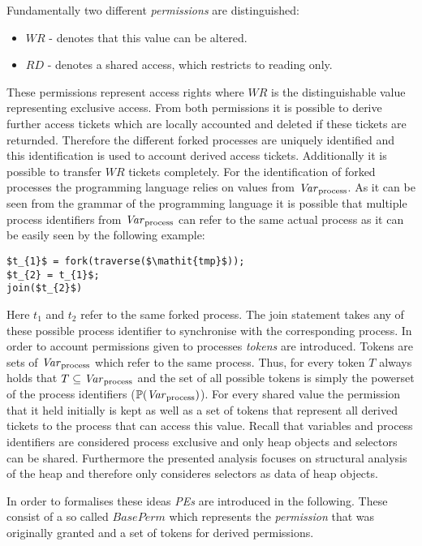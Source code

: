	Fundamentally two different \emph{permissions} are distinguished:
	\begin{itemize}
		\item $\mathit{WR}$ - denotes that this value can be altered.
		\item $\mathit{RD}$ - denotes a shared access, which restricts to
			reading only.
	\end{itemize}
	These permissions represent access rights where $\mathit{WR}$ is the
	distinguishable value representing exclusive access. From both permissions
	it is possible to derive further access tickets which are locally
	accounted and deleted if these tickets are returnded. Therefore
	the different forked processes are uniquely identified and this
	identification is used to account derived access tickets. Additionally it is
	possible to transfer $\mathit{WR}$ tickets completely. For the
	identification of forked processes the programming language relies on values
	from $\mathit{Var}_{\text{process}}$. As it can be seen from the grammar of the programming language
	it is possible that
	multiple process identifiers from $\mathit{Var}_{\text{process}}$ can refer to the same actual process
	as it can be easily seen by the following example:
	\begin{lstlisting}
$t_{1}$ = fork(traverse($\mathit{tmp}$));
$t_{2} = t_{1}$;
join($t_{2}$)
	\end{lstlisting}
	Here $t_{1}$ and $t_{2}$ refer to the same forked process. The join
	statement takes any of these possible process identifier to synchronise with
	the corresponding process. In order to account permissions
	given to processes \emph{tokens} are introduced. Tokens are sets of $\mathit{Var}_{\text{process}}$
	which refer to the same process. Thus, for every token $T$ always holds that
	$T\subseteq \mathit{Var}_{\text{process}}$ and the set of all possible tokens is simply the powerset
	of the process identifiers ($\mathbb{P}(\mathit{Var}_{\text{process}})$). For every shared value
	the permission that it held initially is kept as well as a set of tokens
	that represent all derived tickets to the process that can access this
	value. Recall that variables and process identifiers are considered process
	exclusive and only heap objects and selectors can be shared. Furthermore the
	presented analysis focuses on structural analysis of the heap and therefore
	only consideres selectors as data of heap objects.
	
	In order to formalises these ideas \emph{\acp{PE}} are introduced in
	the following. These consist of a so called $\mathit{BasePerm}$ which
	represents the \emph{permission} that was originally granted and a set of
	tokens for derived permissions.

